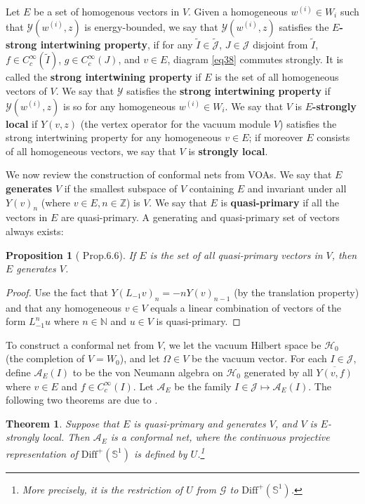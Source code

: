\documentclass[11pt,b5paper,notitlepage]{article}
\theoremstyle{definition}
\theoremstyle{plain}
\newtheorem{thm}[df]{Theorem}
\newtheorem{pp}[df]{Proposition}
\newcommand{\mc}{\mathcal}
\newcommand{\wtd}{\widetilde}
\newcommand{\ovl}{\overline}
\newcommand{\Diffp}{\mathrm{Diff}^+}
\newcommand{\scr}{\mathscr}
\newcommand{\Jtd}{\widetilde{\mathcal J}}
\newcommand{\mbb}{\mathbb}
\numberwithin{equation}{subsection}
\begin{document}
Let $E$ be a set of homogenous vectors in $V$. Given a homogeneous $w^{(i)}\in W_i$ such that $\mc Y(w^{(i)},z)$ is energy-bounded, we say that $\mc Y(w^{(i)},z)$ satisfies the \textbf{$E$-strong intertwining property}, if for any $\wtd I\in\Jtd$, $J\in\mc J$ disjoint from $\wtd I$, $f\in C_c^\infty(\wtd I)$, $g\in C_c^\infty(J)$, and  $v\in E$, diagram \ref{eq38} commutes strongly. It is called the  \textbf{strong intertwining property} if $E$ is the set of all homogeneous vectors of $V$. We say that $\mc Y$ satisfies the \textbf{strong intertwining property} if $\mc Y(w^{(i)},z)$ is so for any homogeneous $w^{(i)}\in W_i$. We say that $V$ is \textbf{$E$-strongly local} \cite{CKLW18} if  $Y(v,z)$ (the vertex operator for the vacuum module $V$) satisfies the strong intertwining property for any homogeneous $v\in E$; if moreover $E$ consists of all homogeneous vectors, we say that $V$ is \textbf{strongly local}.

We now review the construction of conformal nets from VOAs. We say that $E$ \textbf{generates} $V$ if the smallest subspace of $V$ containing $E$ and invariant under all $Y(v)_n$ (where $v\in E,n\in\mbb Z$) is $V$. We say that $E$ is \textbf{quasi-primary} if all the vectors in $E$ are quasi-primary. A generating and quasi-primary set of vectors always exists:

\begin{pp}[\cite{CKLW18} Prop.6.6]\label{lb56}
If $E$ is the set of all quasi-primary vectors in $V$, then $E$ generates $V$.
\end{pp}
\begin{proof}
Use the fact that $Y(L_{-1}v)_n=-nY(v)_{n-1}$ (by the translation property) and that any homogeneous $v\in V$ equals a linear combination of vectors of the form $L_{-1}^nu$ where $n\in\mbb N$ and  $u\in V$ is quasi-primary.
\end{proof}



To construct a conformal net from $V$, we   let the vacuum Hilbert space be $\mc H_0$ (the completion of $V=W_0$), and let $\Omega\in V$ be the vacuum vector. For each $I\in\mc J$, define $\mc A_E(I)$ to be the von Neumann algebra on $\mc H_0$ generated by all $\ovl{Y(v,f)}$ where $v\in E$ and $f\in C_c^\infty(I)$. Let $\mc A_E$ be the family $I\in\mc J\mapsto \mc A_E(I)$. The following two theorems are due to \cite{CKLW18}.

\begin{thm}
Suppose that $E$ is quasi-primary and generates $V$, and $V$ is $E$-strongly local. Then $\mc A_E$ is a conformal net, where the continuous projective representation of $\Diffp(\mbb S^1)$ is defined by $U$.\footnote{More precisely, it is the restriction of $U$ from $\scr G$ to $\Diffp(\mbb S^1)$.}
\end{thm}
\end{document}
